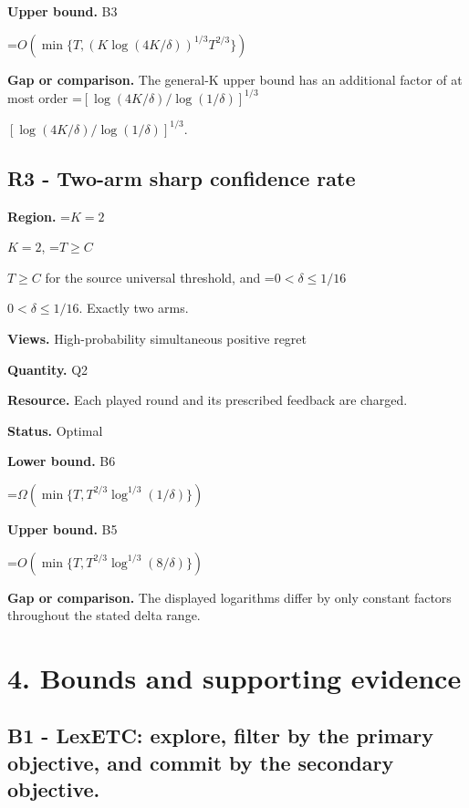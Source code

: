 \documentclass[10pt,a4paper]{article}
\newcommand{\AtlasMath}[1]{\par\begingroup\centering\setbox0=\hbox{$\displaystyle #1$}\ifdim\wd0>1.4\linewidth\typeout{ATLAS WIDE FORMULA: \the\wd0}\fi\ifdim\wd0>\linewidth\resizebox{\linewidth}{!}{\box0}\else\box0\fi\par\endgroup}
\newcommand{\AtlasInlineMath}[1]{\begingroup\setbox0=\hbox{$#1$}\ifdim\wd0>.4\linewidth\endgroup\AtlasMath{#1}\else\endgroup$#1$\fi}
\begin{document}
\textbf{Upper bound.} B3



\AtlasMath{O\!\left(\min\{T,(K\log(4K/\delta))^{1/3}T^{2/3}\}\right)}


\textbf{Gap or comparison.} The general-K upper bound has an additional factor of at most order \AtlasInlineMath{[\log(4K/\delta)/\log(1/\delta)]^{1/3}}.



\subsection{R3 - Two-arm sharp confidence rate}


\textbf{Region.} \AtlasInlineMath{K=2}, \AtlasInlineMath{T\ge C} for the source universal threshold, and \AtlasInlineMath{0<\delta\le1/16}. Exactly two arms.



\textbf{Views.} High-probability simultaneous positive regret



\textbf{Quantity.} Q2



\textbf{Resource.} Each played round and its prescribed feedback are charged.



\textbf{Status.} Optimal



\textbf{Lower bound.} B6



\AtlasMath{\Omega\!\left(\min\{T,T^{2/3}\log^{1/3}(1/\delta)\}\right)}


\textbf{Upper bound.} B5



\AtlasMath{O\!\left(\min\{T,T^{2/3}\log^{1/3}(8/\delta)\}\right)}


\textbf{Gap or comparison.} The displayed logarithms differ by only constant factors throughout the stated delta range.



\section{4. Bounds and supporting evidence}


\subsection{B1 - LexETC: explore, filter by the primary objective, and commit by the secondary objective.}
\end{document}
